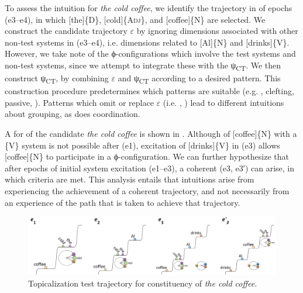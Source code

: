   To assess the  intuition for \textit{the cold coffee}, we identify the trajectory in {} of epochs (e3--e4), in which [the]\{D\}, [cold]\{A\textsc{dj}\}, and [coffee]\{N\} are selected. We construct the candidate trajectory $\varepsilon $ by ignoring  dimensions associated with other non-test systems in (e3--e4), i.e. dimensions related to [Al]\{N\} and [drinks]\{V\}. However, we take note of the ϕ-con\-fi\-gu\-ra\-tions which involve the test systems and non-test systems, since we attempt to integrate these with the   ψ\textsubscript{CT}. We then construct ψ\textsubscript{CT}, by combining $\varepsilon $ and ψ\textsubscript{CT} according to a desired pattern. This construction procedure predetermines which patterns are suitable (e.g. , clefting, passive, ). Patterns which omit or replace $\varepsilon $ (i.e. , ) lead to different intuitions about grouping, as does coordination.

  A  for  of the candidate \textit{the cold coffee} is shown in {}. Although  of [coffee]\{N\} with a \{V\} system is not possible after (e1), excitation of [drinks]\{V\} in (e3) allows [coffee]\{N\} to participate in a ϕ-con\-fi\-gu\-ra\-tion. We can further hypothesize that after epochs of initial system excitation (e1--e3), a coherent  (e3, e3′) can arise, in which  criteria are met. This analysis entails that  intuitions arise from experiencing the achievement of a coherent trajectory, and not necessarily from an experience of the path that is taken to achieve that trajectory.

  
\begin{figure}
\includegraphics[width=\textwidth]{figures/Tilsen-img138.png}
\caption{Topicalization test trajectory for constituency of \textit{the cold coffee}.}
\label{fig:6:19}
\end{figure}
 

